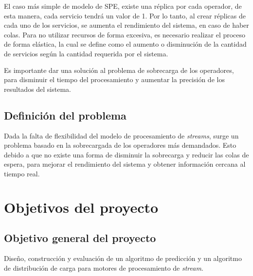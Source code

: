 \documentclass[12pt,letterpaper]{article}
\begin{document}
El caso más simple de modelo de SPE, existe una réplica por cada operador, de esta manera, cada servicio tendrá un valor de 1. Por lo tanto, al crear réplicas de cada uno de los servicios, se aumenta el rendimiento del sistema, en caso de haber colas. Para no utilizar recursos de forma excesiva, es necesario realizar el proceso de forma elástica, la cual se define como el aumento o disminución de la cantidad de servicios según la cantidad requerida por el sistema.


Es importante dar una solución al problema de sobrecarga de los operadores, para disminuir el tiempo del  procesamiento y aumentar la precisión de los resultados del sistema.

\subsection{Definición del problema}
Dada la falta de flexibilidad del modelo de procesamiento de \textsl{streams}, surge un problema basado en la sobrecargada de los operadores más demandados. Esto debido a que no existe una forma de disminuir la sobrecarga y reducir las colas de espera, para mejorar el rendimiento del sistema y obtener información cercana al tiempo real.

\section{Objetivos del proyecto}
\subsection{Objetivo general del proyecto}
Dise\~no, construcción y evaluaci\'on de un algoritmo de predicci\'on y un algoritmo de distribuci\'on de carga para motores de procesamiento de \textsl{stream}.
\end{document}
